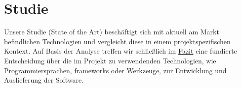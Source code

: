 \chapter{Studie}
Unsere Studie (State of the Art) beschäftigt sich mit aktuell am Markt befindlichen Technologien und vergleicht diese in einem projektspezifischen Kontext. Auf Basis der Analyse treffen wir schließlich im \hyperref[sec:fazit]{Fazit} eine fundierte Entscheidung über die im Projekt zu verwendenden Technologien, wie Programmiersprachen, \gls{framework}s oder Werkzeuge, zur Entwicklung und Auslieferung der Software.